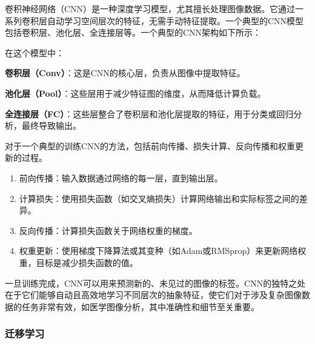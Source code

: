 卷积神经网络（CNN）是一种深度学习模型，尤其擅长处理图像数据。它通过一系列卷积层自动学习空间层次的特征，无需手动特征提取。一个典型的CNN模型包括卷积层、池化层、全连接层等\cite{DL.4}。一个典型的CNN架构如下所示：\cite{4.30 1}



在这个模型中：

\textbf{卷积层（Conv）}：这是CNN的核心层，负责从图像中提取特征。

\textbf{池化层（Pool）}：这些层用于减少特征图的维度，从而降低计算负载。

\textbf{全连接层（FC）}：这些层整合了卷积层和池化层提取的特征，用于分类或回归分析，最终导致输出。

对于一个典型的训练CNN的方法，包括前向传播、损失计算、反向传播和权重更新的过程。\cite{4.30 2}
\begin{enumerate}
    \item 前向传播：输入数据通过网络的每一层，直到输出层。
    \item 计算损失：使用损失函数（如交叉熵损失）计算网络输出和实际标签之间的差异。
    \item 反向传播：计算损失函数关于网络权重的梯度。
    \item 权重更新：使用梯度下降算法或其变种（如Adam或RMSprop）来更新网络权重，目标是减少损失函数的值。
\end{enumerate}
一旦训练完成，CNN可以用来预测新的、未见过的图像的标签。CNN的独特之处在于它们能够自动且高效地学习不同层次的抽象特征，使它们对于涉及复杂图像数据的任务非常有效，如医学图像分析，其中准确性和细节至关重要。\cite{4.30 3}

\subsubsection{迁移学习}

